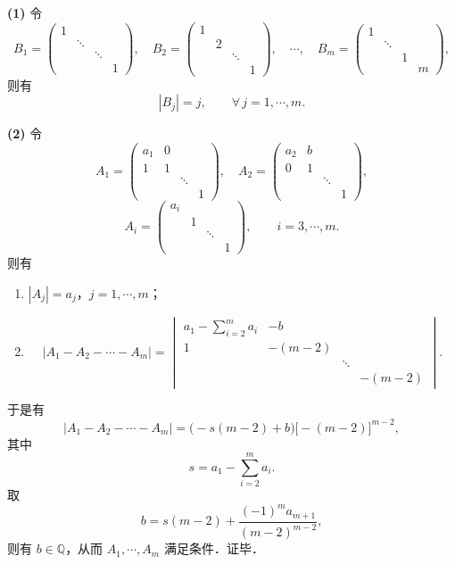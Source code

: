 \begin{solution}
\textbf{(1)} 令
\[
B_1=\begin{pmatrix}
1& & &\\
& \ddots& &\\
& & \ddots&\\
& & &1
\end{pmatrix},\quad
B_2=\begin{pmatrix}
1& & &\\
&2& &\\
& & \ddots&\\
& & &1
\end{pmatrix},\quad\cdots,\quad
B_m=\begin{pmatrix}
1& & &\\
& \ddots& &\\
& &1&\\
& & &m
\end{pmatrix},
\]
则有
\[
|B_j|=j,\qquad \forall\, j=1,\cdots,m.
\]

\textbf{(2)} 令
\[
A_1=\begin{pmatrix}
a_1&0& &\\
1&1& &\\
& & \ddots&\\
& & &1
\end{pmatrix},\quad
A_2=\begin{pmatrix}
a_2&b& &\\
0&1& &\\
& & \ddots&\\
& & &1
\end{pmatrix},
\]
\[
A_i=\begin{pmatrix}
a_i& & &\\
&1& &\\
& & \ddots&\\
& & &1
\end{pmatrix},\qquad i=3,\cdots,m.
\]
则有
\begin{enumerate}[label=(\roman*)]
  \item $|A_j|=a_j$，$j=1,\cdots,m$；
  \item
  \[
  |A_1-A_2-\cdots-A_m|=
  \begin{vmatrix}
  a_1-\sum\limits_{i=2}^{m}a_i&-b& &\\
  1&-(m-2)& &\\
  & & \ddots&\\
  & & &-(m-2)
  \end{vmatrix}.
  \]
\end{enumerate}
于是有
\[
|A_1-A_2-\cdots-A_m|=\bigl(-s(m-2)+b\bigr)\bigl[-(m-2)\bigr]^{m-2},
\]
其中
\[
s=a_1-\sum_{i=2}^{m}a_i.
\]
取
\[
b=s(m-2)+\frac{(-1)^m a_{m+1}}{(m-2)^{m-2}},
\]
则有 $b\in\mathbb{Q}$，从而 $A_1,\cdots,A_m$ 满足条件．证毕．
\end{solution}

